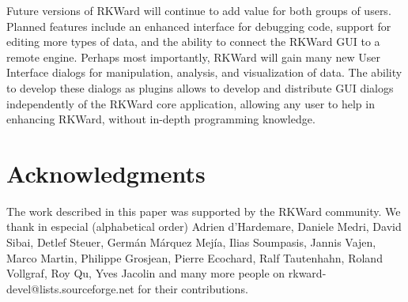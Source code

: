 Future versions of RKWard will continue to add value for both groups of users. Planned features include
an enhanced interface for debugging  code, support for editing more types of data, and the
ability to connect the RKWard GUI to a remote  engine. Perhaps most importantly, RKWard will
gain many new User Interface dialogs for manipulation, analysis, and visualization of data. The ability to
develop these dialogs as plugins allows to develop and distribute GUI dialogs
independently of the RKWard core application, allowing any user to help in enhancing RKWard, without in-depth
programming knowledge.

\section{Acknowledgments}
\label{sec:acknowledgments}
The work described in this paper was supported by the RKWard community. We thank in especial (alphabetical order) Adrien d'Hardemare, 
Daniele Medri, David Sibai, Detlef Steuer, Germ\'an M\'arquez Mej\'ia, Ilias Soumpasis, Jannis Vajen, Marco Martin, 
Philippe Grosjean, Pierre Ecochard, Ralf Tautenhahn, Roland Vollgraf, Roy Qu, Yves Jacolin and many more people on 
rkward-devel@lists.sourceforge.net for their contributions.
